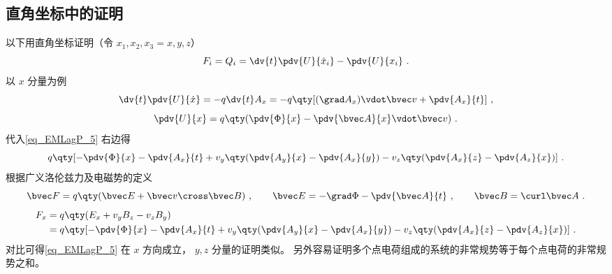 \subsection{直角坐标中的证明}
以下用直角坐标证明（令 $x_1, x_2, x_3 = x,y,z$）
\begin{equation}\label{eq_EMLagP_5}
F_i = Q_i =  \dv{t} \pdv{U}{\dot x_i} - \pdv{U}{x_i}~.
\end{equation}
以 $x$ 分量为例
\begin{equation}
\dv{t} \pdv{U}{\dot x} =  - q\dv{t} A_x =  - q\qty[ (\grad A_x) \vdot \bvec v + \pdv{A_x}{t} ]~,
\end{equation}
\begin{equation}
\pdv{U}{x} = q\qty( \pdv{\Phi}{x} - \pdv{\bvec A}{x} \vdot \bvec v )~.
\end{equation}
代入\autoref{eq_EMLagP_5} 右边得
\begin{equation}
q\qty[ -\pdv{\Phi}{x} - \pdv{A_x}{t} + v_y \qty( \pdv{A_y}{x} - \pdv{A_x}{y} ) - v_z \qty( \pdv{A_x}{z} - \pdv{A_z}{x}) ]~.
\end{equation} 
根据广义洛伦兹力及电磁势的定义
\begin{equation}
\bvec F = q\qty(\bvec E + \bvec v \cross \bvec B)~,
\qquad
\bvec E =  - \grad \Phi  - \pdv{\bvec A}{t}~,
\qquad
\bvec B = \curl \bvec A~.
\end{equation}
\begin{equation}\begin{aligned}
F_x &= q \qty(E_x + v_y B_z - v_z B_y) \\
&= q\qty[ - \pdv{\Phi}{x} - \pdv{A_x}{t} + v_y \qty(\pdv{A_y}{x} - \pdv{A_x}{y}) - v_z \qty( \pdv{A_x}{z} - \pdv{A_z}{x}) ]~.
\end{aligned}\end{equation}
对比可得\autoref{eq_EMLagP_5} 在 $x$ 方向成立， $y,z$ 分量的证明类似。 另外容易证明多个点电荷组成的系统的非常规势等于每个点电荷的非常规势之和。

